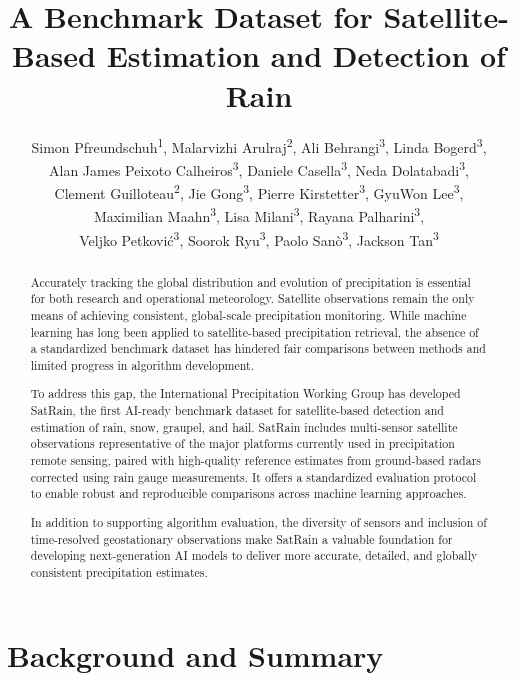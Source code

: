 \documentclass[11pt]{article}
\title{A Benchmark Dataset for Satellite-Based Estimation and Detection of Rain}
\author{%
	Simon Pfreundschuh\textsuperscript{1}, %
	Malarvizhi Arulraj\textsuperscript{2}, %
	Ali Behrangi\textsuperscript{3}, %
	Linda Bogerd\textsuperscript{3}, \\
	Alan James Peixoto Calheiros\textsuperscript{3}, %
	Daniele Casella\textsuperscript{3}, %
	Neda Dolatabadi\textsuperscript{3}, \\ %
	Clement Guilloteau\textsuperscript{2}, %
	Jie Gong\textsuperscript{3}, %
	Pierre Kirstetter\textsuperscript{3}, %
	GyuWon Lee\textsuperscript{3}, \\ %
	Maximilian Maahn\textsuperscript{3}, %
	Lisa Milani\textsuperscript{3}, %
	Rayana Palharini\textsuperscript{3},\\%
	Veljko Petković\textsuperscript{3}, %
	Soorok Ryu\textsuperscript{3}, %
	Paolo Sanò\textsuperscript{3}, %
	Jackson Tan\textsuperscript{3}\\
}
\date{
	\begin{flushleft}
		\footnotesize
		\textsuperscript{1} Department of Atmospheric Science, Colorado State University \\
		\textsuperscript{2} Department of Civil and Environmental Engineering, University of California Irvine \\
		\textsuperscript{3} Department of Hydrology and Atmospheric Sciences, University of Arizona\\
		\textsuperscript{2} Department of Mathematics, University B, City, Country \\
		\textsuperscript{3} Department of Atmospheric Science, Colorado State University \\
		\textsuperscript{4} Instituto Nacional de Pesquisas Espaciais \\
		\textsuperscript{5} Department of Atmospheric Sciences, Kyungpook National University \\
		\textsuperscript{5} Department of Atmospheric Sciences, Kyungpook National University \\
		\textsuperscript{6} NASA Goddard Space Flight Center \\
		\textsuperscript{7} University of Maryland, Baltimore County \\
		\textsuperscript{7} University of Maryland\\
		\textsuperscript{8} Institute for Meteorology, University of Leipzig \\
		\textsuperscript{9} Institute of Atmospheric Sciences and Climate, Italian National Research Council \\
		\textsuperscript{10} Earth System Science Interdisciplinary Center, University of Maryland  \\
		\textsuperscript{10} Cooperative Institute for Satellite Earth System Studies, University of Maryland  \\
	\end{flushleft}
}
\begin{document}
\maketitle


\begin{abstract}

	Accurately tracking the global distribution and evolution of precipitation is
	essential for both research and operational meteorology. Satellite observations
	remain the only means of achieving consistent, global-scale precipitation
	monitoring. While machine learning has long been applied to satellite-based
	precipitation retrieval, the absence of a standardized benchmark dataset has
	hindered fair comparisons between methods and limited progress in algorithm
	development.

	To address this gap, the International Precipitation Working Group has developed
	SatRain, the first AI-ready benchmark dataset for satellite-based detection and
	estimation of rain, snow, graupel, and hail. SatRain includes multi-sensor
	satellite observations representative of the major platforms currently used in
	precipitation remote sensing, paired with high-quality reference estimates from
	ground-based radars corrected using rain gauge measurements. It offers a
	standardized evaluation protocol to enable robust and reproducible comparisons
	across machine learning approaches.

	In addition to supporting algorithm evaluation, the diversity of
	sensors and inclusion of time-resolved geostationary observations make SatRain a
	valuable foundation for developing next-generation AI models to deliver more
	accurate, detailed, and globally consistent precipitation estimates.

\end{abstract}

\section{Background and Summary}
\end{document}
